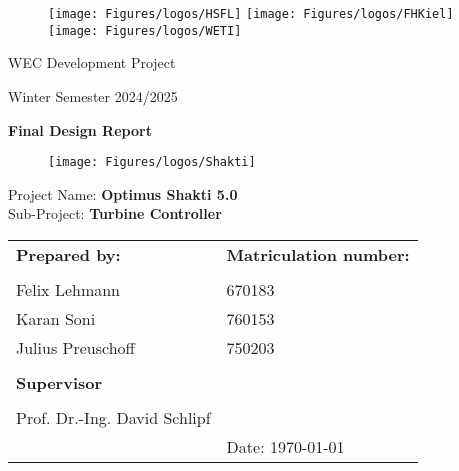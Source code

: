 \newpage
\thispagestyle{empty}
{\selectfont
	\hfuzz=20pt       %
	
	\begin{figure}[!htb]
		\texttt{[image: Figures/logos/HSFL]}
		\endminipage\hfill
		\texttt{[image: Figures/logos/FHKiel]}
		\endminipage\hfill
		\texttt{[image: Figures/logos/WETI]}
		\endminipage
	\end{figure}
		
	
	\vspace{0.5cm}
	\begin{minipage}[b][0cm][t]{\textwidth}
		\fontsize{18pt}{18pt}
		\selectfont
		\begin{center}
			WEC Development Project
		\end{center}
		\fontsize{14pt}{14pt}
		\selectfont
		\begin{center}
			Winter Semester 2024/2025
		\end{center}
		\fontsize{18pt}{18pt}
		\selectfont
		\begin{center}
			\textbf{Final Design Report}
		\end{center}
	\end{minipage}
	
	\vspace{3cm}
	\begin{figure}[tbh]
		\centering
		\texttt{[image: Figures/logos/Shakti]}
	\end{figure}
	
	\begin{minipage}[b][0cm][t]{\textwidth}
		\fontsize{20pt}{20pt}
		\selectfont
		Project Name: \textbf{Optimus Shakti 5.0}\\
		Sub-Project: \textbf{Turbine Controller}
	\end{minipage}
	\begin{minipage}[b][0cm][t]{\textwidth}
		\vspace{1.5cm}
		\fontsize{12pt}{14pt}
		\selectfont
		\begin{tabular}{l b{8cm}}
			\textbf{Prepared by:} & \textbf{Matriculation number:}\\
			\\
			Felix Lehmann & 670183 \\
			Karan Soni & 760153\\
			Julius Preuschoff & 750203 \\
			\\
			\textbf{Supervisor} & \\
			\\
			Prof. Dr.-Ing. David Schlipf & \\
			& Date: \today\\
		\end{tabular}
	\end{minipage}
}

